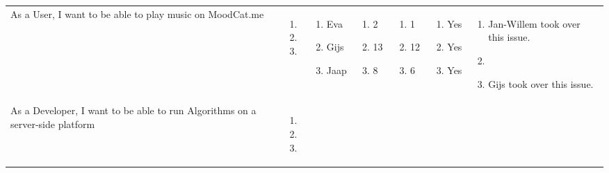 \documentclass[11pt,a4paper,landscape]{article}
\begin{document}
\begin{table}[h]
\begin{tabular}{|p{5cm}|p{1.0cm}|p{2.5cm}|p{1.8cm}|p{1.8cm}|p{1.0cm}|p{12cm}}
As a User, I want to be able to play music on MoodCat.me & \begin{enumerate}[leftmargin=0.3cm,itemindent=0.1cm]
\item 
\item 
\item
\end{enumerate}

& 
\begin{enumerate}[leftmargin=0.1cm,itemindent=0.1cm]
\item[] Eva 
\item[] Gijs 
\item[] Jaap 
\end{enumerate}

& 
\begin{enumerate}[leftmargin=0.1cm,itemindent=0.1cm]
\item[] 2 
\item[] 13 
\item[] 8 
\end{enumerate} 
 & \begin{enumerate}[leftmargin=0.1cm,itemindent=0.1cm]
\item[] 1 
\item[] 12 
\item[] 6 
\end{enumerate}

 & \begin{enumerate}[leftmargin=0.1cm,itemindent=0.1cm]
\item[] Yes
\item[] Yes
\item[] Yes
\end{enumerate}

 & \begin{enumerate}[leftmargin=0.5cm,itemindent=0.1cm]
\item Jan-Willem took over this issue.
\item 
\item Gijs took over this issue.
\end{enumerate}

\\

As a Developer, I want to be able to run Algorithms on a server-side platform & \begin{enumerate}[leftmargin=0.3cm,itemindent=0.1cm]
\item 
\item
\item 
\end{enumerate}


\end{tabular}
\end{table}
\end{document}
